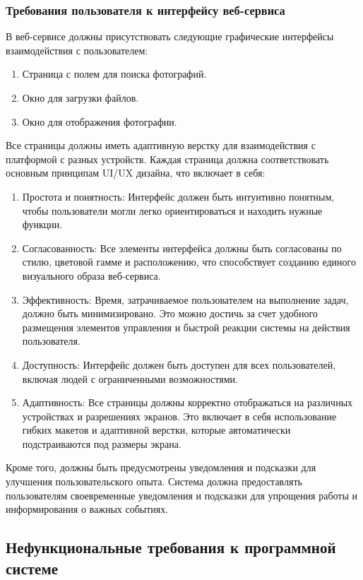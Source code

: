 \subsubsection{Требования пользователя к интерфейсу веб-сервиса}

В веб-сервисе должны присутствовать следующие графические интерфейсы взаимодействия с пользователем:

\begin{enumerate}
	\item Страница с полем для поиска фотографий.
	\item Окно для загрузки файлов.
	\item Окно для отображения фотографии.
\end{enumerate}

Все страницы должны иметь адаптивную верстку для взаимодействия с платформой с разных устройств. Каждая страница должна соответствовать основным принципам UI/UX дизайна, что включает в себя:

\begin{enumerate}
	\item Простота и понятность: Интерфейс должен быть интуитивно понятным, чтобы пользователи могли легко ориентироваться и находить нужные функции.
	\item Согласованность: Все элементы интерфейса должны быть согласованы по стилю, цветовой гамме и расположению, что способствует созданию единого визуального образа веб-сервиса.
	\item Эффективность: Время, затрачиваемое пользователем на выполнение задач, должно быть минимизировано. Это можно достичь за счет удобного размещения элементов управления и быстрой реакции системы на действия пользователя.
	\item Доступность: Интерфейс должен быть доступен для всех пользователей, включая людей с ограниченными возможностями.
	\item Адаптивность: Все страницы должны корректно отображаться на различных устройствах и разрешениях экранов. Это включает в себя использование гибких макетов и адаптивной верстки, которые автоматически подстраиваются под размеры экрана.
\end{enumerate}

Кроме того, должны быть предусмотрены уведомления и подсказки для улучшения пользовательского опыта. Система должна предоставлять пользователям своевременные уведомления и подсказки для упрощения работы и информирования о важных событиях.

\subsection{Нефункциональные требования к программной системе}
